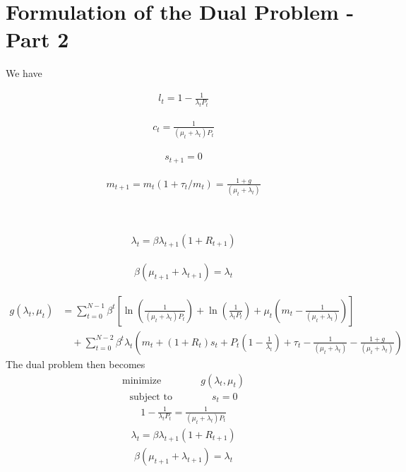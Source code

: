 \section*{Formulation of the Dual Problem - Part 2}\label{ch:ch3_2label}
We have\\
\begin{minipage}{0.2\textwidth}
\begin{align*}
	l_t = 1-\frac{1}{\lambda_t P_t}  
\end{align*}
\end{minipage}
\begin{minipage}{0.2\textwidth}
\begin{align*}
	 c_t = \frac{1}{(\mu_t+\lambda_t)P_t}
\end{align*}
\end{minipage}
\begin{minipage}{0.2\textwidth}
\begin{align*}
	s_{t+1} = 0
\end{align*}
\end{minipage}
\begin{minipage}{0.2\textwidth}
\begin{align*}
	m_{t+1} = m_t(1+\tau_t/m_t)=\frac{1+g}{(\mu_t+\lambda_t)}
\end{align*}
\end{minipage}
\\
\begin{minipage}{0.4\textwidth}
\begin{align*}
	\lambda_t = \beta \lambda_{t+1}(1+R_{t+1})
\end{align*}
\end{minipage}
\begin{minipage}{0.4\textwidth}
\begin{align*}
	\beta(\mu_{t+1}+\lambda_{t+1})=\lambda_t
\end{align*}
\end{minipage}
\begin{align*}
g(\lambda_t,\mu_t) &= \sum_{t=0}^{N-1}{\beta^t}[\ln(\frac{1}{(\mu_t+\lambda_t)P_t})+\ln(\frac{1}{\lambda_t P_t})+\mu_t(m_t-\frac{1}{(\mu_t+\lambda_t)} )]\\
&\quad+\sum_{t=0}^{N-2}{\beta^t}\lambda_t(m_t+(1+R_t)s_t+P_t(1-\frac{1}{\lambda_t}) + \tau_t - \frac{1}{(\mu_t+\lambda_t)} - \frac{1+g}{(\mu_t+\lambda_t)} )
\end{align*}
The dual problem then becomes
\begin{align*}
	\textrm{minimize} \quad\quad\quad\quad g(\lambda_t,\mu_t)
\end{align*}
\begin{align*}
	\textrm{subject to} \quad\quad\quad\quad s_t = 0
\end{align*}
\begin{align*}
	1-\frac{1}{\lambda_t P_t} = \frac{1}{(\mu_t+\lambda_t)P_t}
\end{align*}
\begin{align*}
	\lambda_t = \beta \lambda_{t+1}(1+R_{t+1})
\end{align*}
\begin{align*}
	\beta(\mu_{t+1}+\lambda_{t+1})=\lambda_t
\end{align*}
